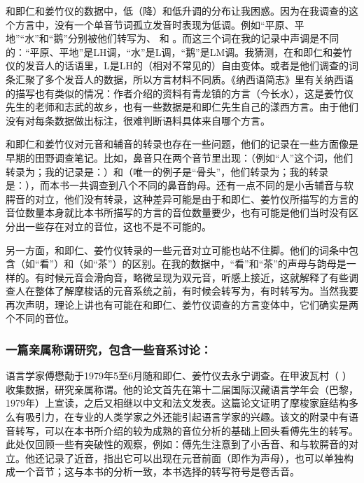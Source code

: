 和即仁和姜竹仪的数据中，低（降）和低升调的分布让我困惑。因为在我调查的这个{方言}中，没有一个{单音节词}孤立发音时表现为低调。例如“平原、平地”“水”和“鹅”分别被他们转写为、 和 。而这三个词在我的记录中声调是不同的：“平原、平地”是LH调，“水”是L调，“鹅”是LM调。我猜测，在和即仁和姜竹仪的发音人的话语里，L是LH的（相对不常见的）自由变体。或者是他们调查的词条汇聚了多个发音人的数据，所以{方言}材料不同质。《纳西语简志》里有关纳西语的描写也有类似的情况：作者介绍的资料有青龙镇的{方言}（今长水），这是姜竹仪先生的老师和志武的故乡，也有一些数据是和即仁先生自己的漾西{方言}。由于他们没有对每条数据做出标注，很难判断语料具体来自哪个{方言}。

和即仁和姜竹仪对元音和辅音的转录也{存在}一些问题，他们的记录在一些方面像是早期的田野调查笔记。比如，鼻音只在两个音节里出现：（例如“人”这个词，他们转录为；我的记录是：）和（唯一的例子是“骨头”，他们转录为；我的转录是：），而本书一共调查到八个不同的鼻音韵母。还有一点不同的是小舌辅音与软腭音的对立，他们没有转录，这种差异可能是由于和即仁、姜竹仪所描写的{方言}的音位数量本身就比本书所描写的{方言}的音位数量要少，也有可能是他们当时没有区分出一些{存在}对立的音位，这也不是不可能的。

另一方面，和即仁、姜竹仪转录的一些元音对立可能也站不住脚。他们的词条中包含（如“看”）和（如“茶”）的区别。在我的数据中，“看”和“茶”的声母与韵母是一样的。有时候元音会滑向音，略微呈现为双元音，听感上接近，这就解释了有些调查人在整体了解摩梭话的元音系统之前，有时候会转写为，有时转写为。当然我要再次声明，理论上讲也有可能在和即仁、姜竹仪调查的{方言}变体中，它们确实是两个不同的音位。

\subsubsection{一篇亲属称谓研究，包含一些音系讨论：\textcite{fu1980}}
\label{sec:fu1980astudyofkinshipterms}

语言学家傅懋勣于1979年5至6月随和即仁、姜竹仪去永宁调查。在甲波瓦村（ ）收集数据，研究亲属称谓。他的论文首先在第十二届国际汉藏语言学年会（巴黎，1979年）上宣读，之后又相继以中文和法文发表\parencite{fu1980,fu1983}。这篇论文证明了摩梭家庭结构多么有吸引力，在专业的人类学家之外还能引起语言学家的兴趣。该文的附录中有语音转写，可以在本书所介绍的较为成熟的音位分析的基础上回头看傅先生的转写。此处仅回顾一些有突破性的观察，例如：傅先生注意到了小舌音、和与软腭音的对立。他还记录了近音，指出它可以出现在元音前面（即作为声母），也可以{单独}构成一个音节；这与本书的分析一致，本书选择的转写符号是卷舌音。

